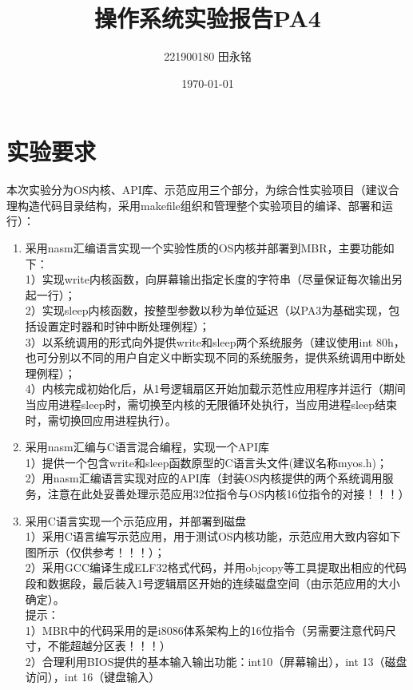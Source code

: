 \documentclass{LabReport}
\title{操作系统实验报告PA4}
\author{221900180 田永铭}
\date{\today}
\begin{document}
	\maketitle
	
	\tableofcontents
	
	\newpage
	
	\section{实验要求}
本次实验分为OS内核、API库、示范应用三个部分，为综合性实验项目（建议合理构造代码目录结构，采用makefile组织和管理整个实验项目的编译、部署和运行）：\\
\begin{enumerate}
		\item 采用nasm汇编语言实现一个实验性质的OS内核并部署到MBR，主要功能如下：\\
1）实现write内核函数，向屏幕输出指定长度的字符串（尽量保证每次输出另起一行）；\\
2）实现sleep内核函数，按整型参数以秒为单位延迟（以PA3为基础实现，包括设置定时器和时钟中断处理例程）；\\
3）以系统调用的形式向外提供write和sleep两个系统服务（建议使用int 80h，也可分别以不同的用户自定义中断实现不同的系统服务，提供系统调用中断处理例程）；\\
4）内核完成初始化后，从1号逻辑扇区开始加载示范性应用程序并运行（期间当应用进程sleep时，需切换至内核的无限循环处执行，当应用进程sleep结束时，需切换回应用进程执行）。
	\item 采用nasm汇编与C语言混合编程，实现一个API库\\
	1）提供一个包含write和sleep函数原型的C语言头文件(建议名称myos.h)；\\
	2）用nasm汇编语言实现对应的API库（封装OS内核提供的两个系统调用服务，注意在此处妥善处理示范应用32位指令与OS内核16位指令的对接！！！）
	\item 采用C语言实现一个示范应用，并部署到磁盘\\
	1）采用C语言编写示范应用，用于测试OS内核功能，示范应用大致内容如下图所示（仅供参考！！！）；\\
	2）采用GCC编译生成ELF32格式代码，并用objcopy等工具提取出相应的代码段和数据段，最后装入1号逻辑扇区开始的连续磁盘空间（由示范应用的大小确定）。\\
	提示：\\	
	1）MBR中的代码采用的是i8086体系架构上的16位指令（另需要注意代码尺寸，不能超越分区表！！！）\\	2）合理利用BIOS提供的基本输入输出功能：int10（屏幕输出），int 13（磁盘访问），int 16（键盘输入）\\
	
\end{enumerate}
	
\end{document}
